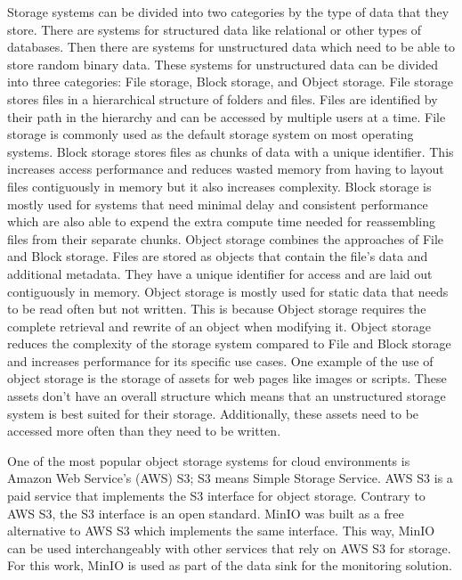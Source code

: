 Storage systems can be divided into two categories by the type of data that they store.
There are systems for structured data like relational or other types of databases.
Then there are systems for unstructured data which need to be able to store random binary data.
These systems for unstructured data can be divided into three categories: File storage, Block storage, and Object storage.
File storage stores files in a hierarchical structure of folders and files.
Files are identified by their path in the hierarchy and can be accessed by multiple users at a time.
File storage is commonly used as the default storage system on most operating systems.
Block storage stores files as chunks of data with a unique identifier. This increases access performance
and reduces wasted memory from having to layout files contiguously in memory but it also increases complexity.
Block storage is mostly used for systems that need minimal delay and consistent performance which are also
able to expend the extra compute time needed for reassembling files from their separate chunks.
Object storage combines the approaches of File and Block storage. Files are stored as objects that
contain the file's data and additional metadata. They have a unique identifier for access and are laid out
contiguously in memory. Object storage is mostly used for static data that needs to be read often but not written.
This is because Object storage requires the complete retrieval and rewrite of an object when modifying it.
Object storage reduces the complexity of the storage system compared to File and Block storage and increases
performance for its specific use cases. One example of the use of object storage is the storage of
assets for web pages like images or scripts. These assets don't have an overall structure which means
that an unstructured storage system is best suited for their storage.
Additionally, these assets need to be accessed more often than they need to be written.

One of the most popular object storage systems for cloud environments is Amazon Web Service's (AWS)
S3; S3 means Simple Storage Service. AWS S3 is a paid service that implements the S3 interface for object storage.
Contrary to AWS S3, the S3 interface is an open standard.
MinIO was built as a free alternative to AWS S3 which implements the same interface.
This way, MinIO can be used interchangeably with other services that rely on AWS S3 for storage.
For this work, MinIO is used as part of the data sink for the monitoring solution.